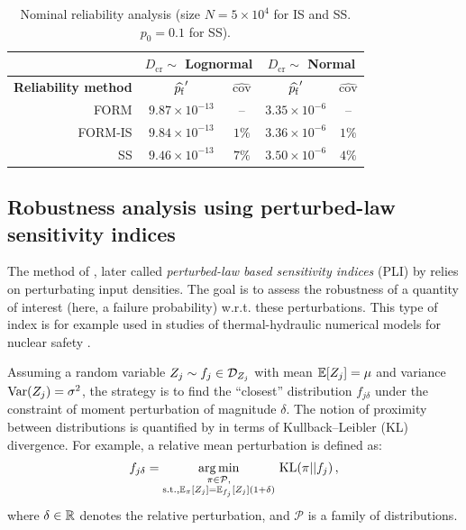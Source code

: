 \begin{table}[h]
    \centering
    \caption{Nominal reliability analysis (size $N=5 \times 10^4$ for IS and SS. $p_0=0.1$ for SS).}
    \begin{tabular}{r||c|c|c|c}
              &  \multicolumn{2}{c|}{$D_{\mathrm{cr}} \sim $ \bf Lognormal} & \multicolumn{2}{c}{$D_{\mathrm{cr}} \sim $ \bf Normal}\\
    \hline
    \bf Reliability method & $\widehat{p_\mathrm{f}}'$       & $\widehat{\mathrm{cov}}$    & $\widehat{p_\mathrm{f}}'$       & $\widehat{\mathrm{cov}}$ \\
    \hline\hline
    FORM      & $9.87 \times 10^{-13}$ & --                    & $3.35 \times 10^{-6}$ & --\\
    \hline
    FORM-IS   & $9.84 \times 10^{-13}$ & $1 \%$                & $3.36 \times 10^{-6}$ & $1 \%$\\
    \hline
    SS        & $9.46 \times 10^{-13}$ & $7 \%$               & $3.50 \times 10^{-6}$ & $4 \%$\\ 
    \end{tabular}
    \label{tab:pf_result_table}
\end{table}


\subsection{Robustness analysis using perturbed-law sensitivity indices}\label{sec:owt_robustness}
The method of \citet{lemaitre_2015_PLI}, later called \textit{perturbed-law based sensitivity indices} (PLI) by \citet{sueur_2017_PLI} relies on perturbating input densities. 
The goal is to assess the robustness of a quantity of interest (here, a failure probability) w.r.t. these perturbations. 
This type of index is for example used in studies of thermal-hydraulic numerical models for nuclear safety \citep{iooss_2022_pli}. 

Assuming a random variable $Z_j \sim f_j \in \mathcal{D}_{Z_j}$ with mean $\mathbb{E}[Z_j]=\mu$ and variance $\operatorname{Var}(Z_j) = \sigma^2$, the strategy is to find the ``closest'' distribution $f_{j \delta}$ under the constraint of moment perturbation of magnitude $\delta$.  
The notion of proximity between distributions is quantified by \citet{lemaitre_2015_PLI} in terms of Kullback–Leibler (KL) divergence. 
For example, a relative mean perturbation is defined as: 
\begin{eqnarray}
    f_{j \delta} = \operatorname*{arg\,min}_{\substack{\pi\in \mathcal{P}, \\ \mathrm{s.t.}, \mathbb{E}_\pi[Z_j] = \mathbb{E}_{f_j}[Z_j](1 + \delta)}} \, \mathrm{KL}(\pi||f_j)\, , 
\end{eqnarray} 
where $\delta \in \mathbb{R}$ denotes the relative perturbation, and $\mathcal{P}$ is a family of distributions. 

